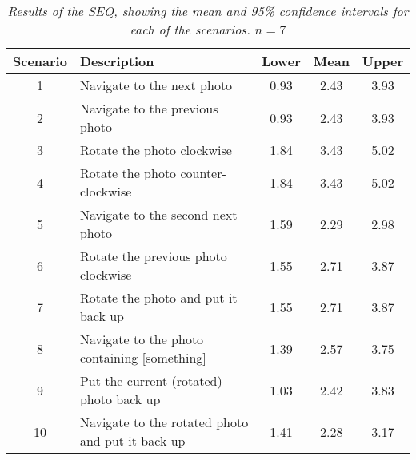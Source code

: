 \documentclass[11pt,a4paper]{article}
\begin{document}
\renewcommand{\arraystretch}{1.0}
\begin{table}[h!]
\begin{center}
\begin{tabular}{c  l || c || c | c}
\textbf{Scenario} & \textbf{Description} & 
\textbf{Lower} &
\textbf{Mean} &
\textbf{Upper} \\
\hline
1 & Navigate to the next photo & 0.93 & 2.43 & 3.93 \\
2 & Navigate to the previous photo & 0.93 & 2.43 & 3.93 \\
3 & Rotate the photo clockwise & 1.84 & 3.43 & 5.02 \\
4 & Rotate the photo counter-clockwise  & 1.84 & 3.43 & 5.02 \\
5 & Navigate to the second next photo & 1.59 & 2.29 & 2.98 \\
6 & Rotate the previous photo clockwise & 1.55 & 2.71 & 3.87 \\
7 & Rotate the photo and put it back up & 1.55 & 2.71 & 3.87\\
8 & Navigate to the photo containing [something]& 1.39 & 2.57 & 3.75\\
9 & Put the current (rotated) photo back up  & 1.03 & 2.42 & 3.83\\
10 & Navigate to the rotated photo and put it back up & 1.41 & 2.28 & 3.17\\
\end{tabular}
\end{center}
\caption{\textit{Results of the SEQ, showing the mean and 95\% confidence intervals for each of the scenarios. $n=7$}}
\label{tab:seq}
\end{table}
\end{document}
